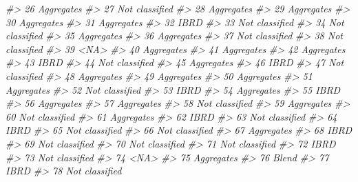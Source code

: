 \documentclass[
  xelatex, ja=standard]{bxjsbook}
\newenvironment{Shaded}{\begin{snugshade}}{\end{snugshade}}
\newcommand{\CommentTok}[1]{\textcolor[rgb]{0.56,0.35,0.01}{\textit{#1}}}
\theoremstyle{definition}
\theoremstyle{definition}
\theoremstyle{definition}
\theoremstyle{definition}
\theoremstyle{remark}
\begin{document}
\begin{Shaded}
\begin{Highlighting}[]
\CommentTok{\#\textgreater{} 26      Aggregates}
\CommentTok{\#\textgreater{} 27  Not classified}
\CommentTok{\#\textgreater{} 28      Aggregates}
\CommentTok{\#\textgreater{} 29      Aggregates}
\CommentTok{\#\textgreater{} 30      Aggregates}
\CommentTok{\#\textgreater{} 31      Aggregates}
\CommentTok{\#\textgreater{} 32            IBRD}
\CommentTok{\#\textgreater{} 33  Not classified}
\CommentTok{\#\textgreater{} 34  Not classified}
\CommentTok{\#\textgreater{} 35      Aggregates}
\CommentTok{\#\textgreater{} 36      Aggregates}
\CommentTok{\#\textgreater{} 37  Not classified}
\CommentTok{\#\textgreater{} 38  Not classified}
\CommentTok{\#\textgreater{} 39            \textless{}NA\textgreater{}}
\CommentTok{\#\textgreater{} 40      Aggregates}
\CommentTok{\#\textgreater{} 41      Aggregates}
\CommentTok{\#\textgreater{} 42      Aggregates}
\CommentTok{\#\textgreater{} 43            IBRD}
\CommentTok{\#\textgreater{} 44  Not classified}
\CommentTok{\#\textgreater{} 45      Aggregates}
\CommentTok{\#\textgreater{} 46            IBRD}
\CommentTok{\#\textgreater{} 47  Not classified}
\CommentTok{\#\textgreater{} 48      Aggregates}
\CommentTok{\#\textgreater{} 49      Aggregates}
\CommentTok{\#\textgreater{} 50      Aggregates}
\CommentTok{\#\textgreater{} 51      Aggregates}
\CommentTok{\#\textgreater{} 52  Not classified}
\CommentTok{\#\textgreater{} 53            IBRD}
\CommentTok{\#\textgreater{} 54      Aggregates}
\CommentTok{\#\textgreater{} 55            IBRD}
\CommentTok{\#\textgreater{} 56      Aggregates}
\CommentTok{\#\textgreater{} 57      Aggregates}
\CommentTok{\#\textgreater{} 58  Not classified}
\CommentTok{\#\textgreater{} 59      Aggregates}
\CommentTok{\#\textgreater{} 60  Not classified}
\CommentTok{\#\textgreater{} 61      Aggregates}
\CommentTok{\#\textgreater{} 62            IBRD}
\CommentTok{\#\textgreater{} 63  Not classified}
\CommentTok{\#\textgreater{} 64            IBRD}
\CommentTok{\#\textgreater{} 65  Not classified}
\CommentTok{\#\textgreater{} 66  Not classified}
\CommentTok{\#\textgreater{} 67      Aggregates}
\CommentTok{\#\textgreater{} 68            IBRD}
\CommentTok{\#\textgreater{} 69  Not classified}
\CommentTok{\#\textgreater{} 70  Not classified}
\CommentTok{\#\textgreater{} 71  Not classified}
\CommentTok{\#\textgreater{} 72            IBRD}
\CommentTok{\#\textgreater{} 73  Not classified}
\CommentTok{\#\textgreater{} 74            \textless{}NA\textgreater{}}
\CommentTok{\#\textgreater{} 75      Aggregates}
\CommentTok{\#\textgreater{} 76           Blend}
\CommentTok{\#\textgreater{} 77            IBRD}
\CommentTok{\#\textgreater{} 78  Not classified}

\end{Highlighting}
\end{Shaded}
\end{document}
